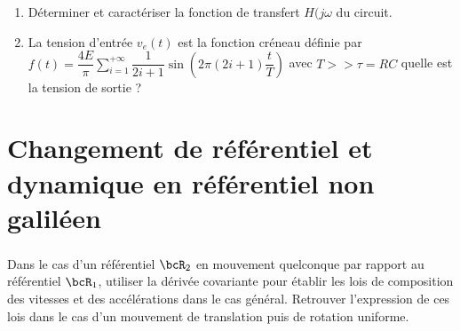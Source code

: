     \subsection{}
    \begin{enumerate}
        \item Déterminer et caractériser la fonction de transfert \(H(j\omega\) du circuit.



        \item La tension d'entrée \(v_e(t)\) est la fonction créneau définie par \(f(t) = \dfrac{4E}{\pi} \sum_{i=1}^{+\infty} \dfrac{1}{2i+1} \sin \left( 2 \pi (2i+1) \dfrac{t}{T} \right)\) avec \(T >> \tau = RC\) quelle est la tension de sortie ?

    \end{enumerate}
    
    \chapter{Changement de référentiel et dynamique en référentiel non galiléen}
    
    \subsection{}
    
    Dans le cas d'un référentiel $\bcR_2$ en mouvement quelconque par rapport au référentiel $\bcR_1$, utiliser la dérivée covariante pour établir les lois de composition des vitesses et des accélérations dans le cas général. Retrouver l'expression de ces lois dans le cas d'un mouvement de translation puis de rotation uniforme.
    
